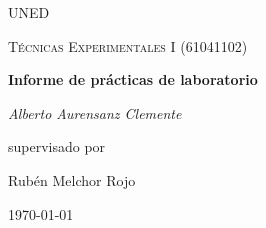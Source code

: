 \documentclass[12pt,spanish]{report}
\begin{document}
    \begin{titlepage}
        \centering
        {\LARGE \textsc{UNED}\par}
        \vspace{1cm}
        {\Large \textsc{Técnicas Experimentales I (61041102)}\par}
        \vspace{1.5cm}
        {\huge\bfseries Informe de prácticas de laboratorio\par}
        \vspace{2cm}
        {\Large\itshape Alberto Aurensanz Clemente\par}
        \vfill
        supervisado por\par
        Rubén Melchor Rojo

        \vfill

        {\large \today\par}
    \end{titlepage}
\end{document}
